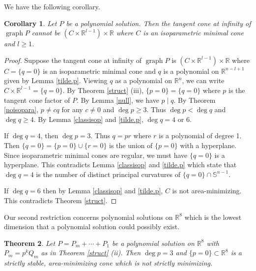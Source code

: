 \documentclass[pdflatex,sn-mathphys-num]{sn-jnl}%
\theoremstyle{thmstyleone}%
\newtheorem{theorem}{Theorem}[section]%
\newtheorem{corollary}[theorem]{Corollary}
\theoremstyle{thmstyletwo}%
\theoremstyle{thmstylethree}%
\newcommand{\R}{\mathbb{R}}
\newcommand{\SSS}{\mathbb{S}}
\DeclareMathOperator{\graph}{graph}
\begin{document}
We have the following corollary.
\begin{corollary}\label{noisopara.geometric}
	Let $P$ be a polynomial solution. Then the tangent cone at infinity of $\graph P$ cannot be $(C\times\R^{l-1})\times \R$ where $C$ is an isoparametric minimal cone and $l\ge 1$.
\end{corollary}
\begin{proof}
	Suppose the tangent cone at infinity of $\graph P$ is $(C\times\R^{l-1})\times \R$ where $C=\{q=0\}$ is an isoparametric minimal cone and $q$ is a polynomial on $\R^{n-l+1}$ given by Lemma \ref{tilde.p}. Viewing $q$ as a polynomial on $\R^n$, we can write $C\times\R^{l-1}=\{q=0\}$. By Theorem \ref{struct} (iii), $\{p=0\}=\{q=0\}$ where $p$ is the tangent cone factor of $P$. By Lemma \ref{null}, we have $p\mid q$. By Theorem \ref{noisopara}, $p\neq cq$ for any $c\neq0$ and $\deg p\ge 3$. Thus $\deg p<\deg q$ and $\deg q\ge 4$. By Lemma \ref{classisop} and \ref{tilde.p}, $\deg q=4$ or $6$. 
	
	If $\deg q=4$, then $\deg p=3$. Thus $q=pr$ where $r$ is a polynomial of degree 1. Then $\{q=0\}=\{p=0\}\cup\{r=0\}$ is the union of $\{p=0\}$ with a hyperplane. Since isoparametric minimal cones are regular, we must have $\{q=0\}$ is a hyperplane. This contradicts Lemma \ref{classisop} and \ref{tilde.p} which state that $\deg q=4$ is the number of distinct principal curvatures of $\{q=0\}\cap \SSS^{n-1}$.
	
	If $\deg q=6$ then by Lemma \ref{classisop} and \ref{tilde.p}, $C$ is not area-minimizing. This contradicts Theorem \ref{struct}.
\end{proof}

Our second restriction concerns polynomial solutions on $\R^8$ which is the lowest dimension that a polynomial solution could possibly exist.

\begin{theorem}\label{R8cubic}
	Let $P=P_m+\cdots+P_1$ be a polynomial solution on $\R^8$ with $P_m=p^kQ_m$ as in Theorem \ref{struct} (ii). Then $\deg p=3$ and $\{p=0\}\subset \R^8$ is a strictly stable, area-minimizing cone which is not strictly minimizing.
\end{theorem}
\end{document}
